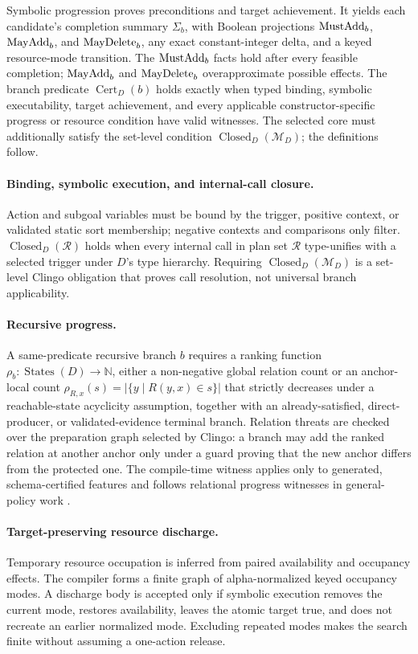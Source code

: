Symbolic progression proves preconditions and target achievement. It yields
each candidate's completion summary $\Sigma_b$, with Boolean
projections $\mathrm{MustAdd}_b$, $\mathrm{MayAdd}_b$, and $\mathrm{MayDelete}_b$, any exact
constant-integer delta, and a keyed resource-mode transition. The $\mathrm{MustAdd}_b$
facts hold after every feasible completion; $\mathrm{MayAdd}_b$ and $\mathrm{MayDelete}_b$
overapproximate possible effects. The branch predicate
$\operatorname{Cert}_D(b)$ holds exactly when typed binding, symbolic
executability, target achievement, and every applicable constructor-specific
progress or resource condition have valid witnesses. The selected core must
additionally satisfy the set-level condition
$\operatorname{Closed}_D(\mathcal M_D)$; the definitions follow.

\paragraph{Binding, symbolic execution, and internal-call closure.}
Action and subgoal variables must be bound by the trigger, positive context, or
validated static sort membership; negative contexts and comparisons only
filter.
$\operatorname{Closed}_D(\mathcal R)$ holds when every internal call in plan set
$\mathcal R$ type-unifies with a selected trigger under $D$'s type hierarchy.
Requiring $\operatorname{Closed}_D(\mathcal M_D)$ is a set-level Clingo
obligation that proves call resolution, not universal branch applicability.

\paragraph{Recursive progress.}
A same-predicate recursive branch $b$ requires a ranking function
$\rho_b:\operatorname{States}(D)\rightarrow\mathbb N$, either a non-negative
global relation count or an anchor-local count
$\rho_{R,x}(s)=|\{y\mid R(y,x)\in s\}|$ that strictly decreases under a
reachable-state acyclicity assumption, together with an
already-satisfied, direct-producer, or validated-evidence terminal branch.
Relation threats are checked over the preparation graph selected by Clingo: a
branch may add the ranked relation at another anchor only under a guard proving
that the new anchor differs from the protected one. The compile-time witness
applies only to generated, schema-certified features and follows relational
progress witnesses in
general-policy work \cite{Frances2021LearningGeneralPolicies}.

\paragraph{Target-preserving resource discharge.}
Temporary resource occupation is inferred from paired availability and
occupancy effects. The compiler forms a finite graph of alpha-normalized keyed
occupancy modes. A discharge body is accepted only if symbolic execution
removes the current mode, restores availability, leaves the atomic target true,
and does not recreate an earlier normalized mode. Excluding repeated modes
makes the search finite without assuming a one-action release.


